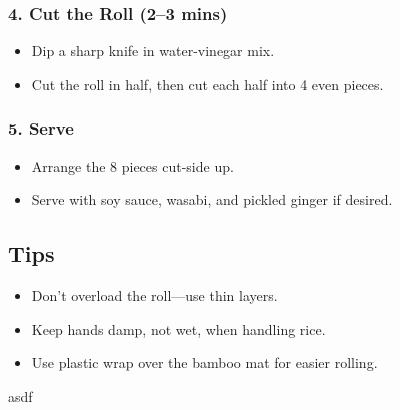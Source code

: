 \documentclass[landscape, a4paper]{article}
\begin{document}
\begin{minipage}[t]{0.31\textwidth}
	\subsubsection*{4. Cut the Roll (2–3 mins)}
	\begin{itemize}
		\item Dip a sharp knife in water-vinegar mix.
		\item Cut the roll in half, then cut each half into 4 even pieces.
	\end{itemize}

	\subsubsection*{5. Serve}
	\begin{itemize}
		\item Arrange the 8 pieces cut-side up.
		\item Serve with soy sauce, wasabi, and pickled ginger if desired.
	\end{itemize}

	\subsection*{Tips}
	\begin{itemize}
		\item Don’t overload the roll—use thin layers.
		\item Keep hands damp, not wet, when handling rice.
		\item Use plastic wrap over the bamboo mat for easier rolling.
	\end{itemize}


\end{minipage}%
\hfill\color{white}%
\vrule width 0.01cm
\hfill\color{black}%
\begin{minipage}[t]{0.31\textwidth}
	\vspace{0cm}
	\setlength{\parskip}{0.25cm}

	asdf

\end{minipage}%
\end{document}

